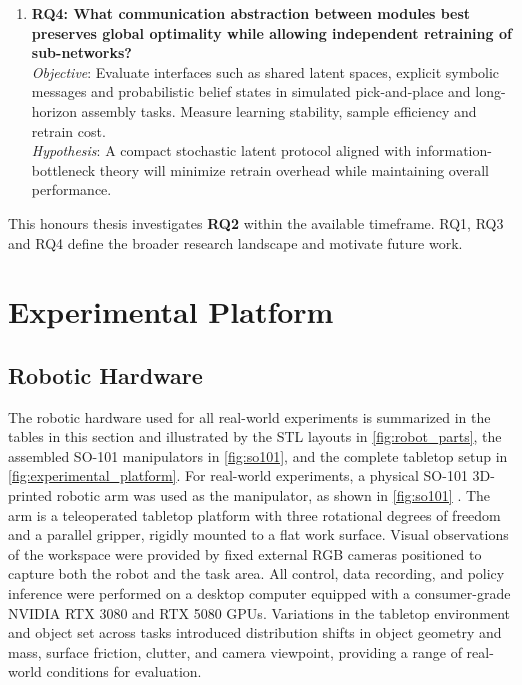 \begin{enumerate}
    \item \textbf{RQ4: What communication abstraction between modules best preserves global optimality while allowing independent retraining of sub-networks?}\\[2pt]
    \textit{Objective}: Evaluate interfaces such as shared latent spaces, explicit symbolic messages and probabilistic belief states in simulated pick-and-place and long-horizon assembly tasks. Measure learning stability, sample efficiency and retrain cost.\\[2pt]
    \textit{Hypothesis}: A compact stochastic latent protocol aligned with information-bottleneck theory will minimize retrain overhead while maintaining overall performance.
\end{enumerate}

This honours thesis investigates \textbf{RQ2} within the available timeframe. RQ1, RQ3 and RQ4 define the broader research landscape and motivate future work.

\section{Experimental Platform}

\subsection{Robotic Hardware}

The robotic hardware used for all real-world experiments is summarized in the tables in this section and illustrated by the STL layouts in \cref{fig:robot_parts}, the assembled SO-101 manipulators in \cref{fig:so101}, and the complete tabletop setup in \cref{fig:experimental_platform}. For real-world experiments, a physical SO-101 3D-printed robotic arm was used as the manipulator, as shown in \cref{fig:so101} . The arm is a teleoperated tabletop platform with three rotational degrees of freedom and a parallel gripper, rigidly mounted to a flat work surface. Visual observations of the workspace were provided by fixed external RGB cameras positioned to capture both the robot and the task area. All control, data recording, and policy inference were performed on a desktop computer equipped with a consumer-grade NVIDIA RTX 3080 and RTX 5080 \acp{GPU}. Variations in the tabletop environment and object set across tasks introduced distribution shifts in object geometry and mass, surface friction, clutter, and camera viewpoint, providing a range of real-world conditions for evaluation.

